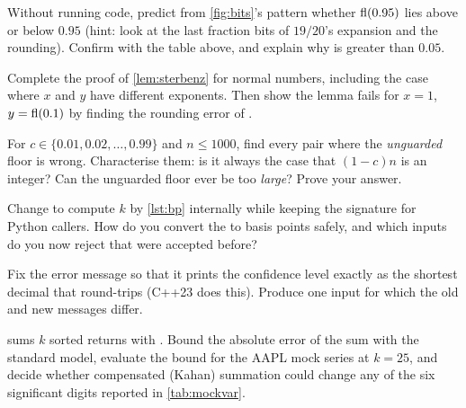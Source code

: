 \begin{exercises}
 Without running code, predict from \cref{fig:bits}'s pattern whether $\mathrm{fl}(0.95)$ lies above or below
$0.95$ (hint: look at the last fraction bits of $19/20$'s expansion and the rounding). Confirm with the table above, and
explain why  is greater than $0.05$.

 Complete the proof of \cref{lem:sterbenz} for normal numbers, including the case where $x$ and $y$
have different exponents. Then show the lemma fails for $x=1$, $y=\mathrm{fl}(0.1)$ by finding the rounding error of .

 For $c\in\{0.01,0.02,\dots,0.99\}$ and $n\le1000$, find every pair where the \emph{unguarded}
floor is wrong. Characterise them: is it always the case that $(1-c)n$ is an integer? Can the unguarded floor ever be too
\emph{large}? Prove your answer.

 Change  to compute $k$ by \cref{lst:bp} internally while keeping the
 signature for Python callers. How do you convert the  to basis points safely, and
which inputs do you now reject that were accepted before?

 Fix the error message so that it prints the confidence level exactly as the shortest decimal that
round-trips (C++23  does this). Produce one input for which the old and new messages differ.

  sums $k$ sorted returns with . Bound the absolute error of the
sum with the standard model, evaluate the bound for the AAPL mock series at $k=25$, and decide whether compensated (Kahan)
summation could change any of the six significant digits reported in \cref{tab:mockvar}.
\end{exercises}

